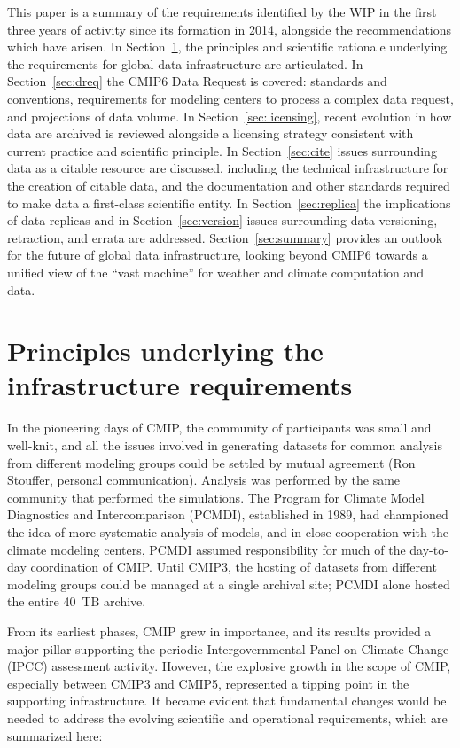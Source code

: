 \documentclass[gmd,manuscript]{copernicus}
\newcommand{\secref}[1] {\mbox{Section  \ref{sec:#1}}}
\begin{document}
This paper is a summary of the requirements identified by the WIP in
the first three years of activity since its formation in 2014,
alongside the recommendations which have arisen. In
\secref{principles}, the principles and scientific rationale
underlying the requirements for global data infrastructure are
articulated. In \secref{dreq} the CMIP6 Data Request is covered:
standards and conventions, requirements for modeling centers to
process a complex data request, and projections of data volume. 
In \secref{licensing}, recent
evolution in how data are archived is reviewed alongside a licensing
strategy consistent with current practice and scientific principle. In
\secref{cite} issues surrounding data as a citable resource are
discussed, including the technical infrastructure for the creation of
citable data, and the documentation and other standards required to
make data a first-class scientific entity. In \secref{replica} the
implications of data replicas and in \secref{version} issues
surrounding data versioning, retraction, and errata are addressed.
\secref{summary} provides an outlook for the future of global data
infrastructure, looking beyond CMIP6 towards a unified view of
the ``vast machine'' for weather and climate computation and data.

\section{Principles underlying the infrastructure requirements}
\label{sec:principles}

In the pioneering days of CMIP, the community of participants was
small and well-knit, and all the issues involved in generating
datasets for common analysis from different modeling groups could be
settled by mutual agreement (Ron Stouffer, personal communication).
Analysis was performed by the same community that performed the
simulations. The Program for Climate Model Diagnostics and
Intercomparison (PCMDI), established in 1989, had championed the idea
of more systematic analysis of models, and in close cooperation with
the climate modeling centers, PCMDI assumed responsibility for
much of the day-to-day coordination of CMIP. Until CMIP3, the hosting
of datasets from different modeling groups could be managed at a
single archival site; PCMDI alone hosted the entire 40~TB archive.

From its earliest phases, CMIP grew in importance, and its results
provided a major pillar supporting the periodic Intergovernmental
Panel on Climate Change (IPCC) assessment activity. However, the
explosive growth in the scope of CMIP, especially between CMIP3 and
CMIP5, represented a tipping point in the supporting infrastructure. 
It became evident that fundamental changes would be needed to address 
the evolving scientific and operational requirements, which are summarized
here:
\end{document}
